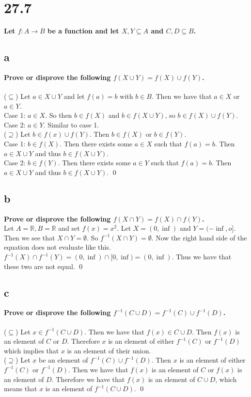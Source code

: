 \documentclass{article}
\begin{document}
\section*{27.7}
\textbf{Let $f: A \rightarrow B$ be a function and let $X, Y \subseteq A$ and $C, D \subseteq B$.}
\subsection*{a}
\textbf{Prove or disprove the following $f(X \cup Y) = f(X) \cup f(Y)$.}\\
\proof\\
($\subseteq$) Let $a \in X \cup Y$ and let $f(a) = b$ with $b \in B$. Then we have that $a \in X$ or $a \in Y$.\\
Case 1: $a \in X$. So then $b \in f(X)$ and $b \in f(X \cup Y)$, so $b \in f(X) \cup f(Y)$.\\
Case 2: $a \in Y$. Similar to case 1.\\
($\supseteq$) Let $b \in f(x) \cup f(Y)$. Then $b \in f(X)$ or $b \in f(Y)$.\\
Case 1: $b \in f(X)$. Then there exists some $a \in X$ such that $f(a) = b$. Then $a \in X \cup Y$ and thus $b \in f(X \cup Y)$.\\
Case 2: $b \in f(Y)$. Then there exists some $a \in Y$ such that $f(a) = b$. Then $a \in X \cup Y$ and thus $b \in f(X \cup Y)$. \qed

\subsection*{b}
\textbf{Prove or disprove the following $f(X \cap Y) = f(X) \cap f(Y)$.}\\
\noindent \dproof Let $A = \mathbb{R}, B = \mathbb{R}$ and set $f(x) = x^2$. Let $X = (0, \inf)$ and $Y = (-\inf, o]$. Then we see that $X \cap Y = \emptyset$. So $f^{-1}(X \cap Y) = \emptyset$. Now the right hand side of the equation does not evaluate like this. $f^{-1}(X) \cap f^{-1}(Y) = (0, \inf) \cap [0, \inf) = (0, \inf)$. Thus we have that these two are not equal. \qed

\subsection*{c}
\textbf{Prove or disprove the following $f^{-1}(C \cup D) = f^{-1}(C) \cup f^{-1}(D)$.}\\
\noindent \proof\\
($\subseteq$) Let $x \in f^{-1}(C \cup D)$. Then we have that $f(x) \in C \cup D$. Then $f(x)$ is an element of $C$ or $D$. Therefore $x$ is an element of either $f^{-1}(C)$ or $f^{-1}(D)$ which implies that $x$ is an element of their union.\\
($\supseteq$) Let $x$ be an element of $f^{-1}(C) \cup f^{-1}(D)$. Then $x$ is an element of either $f^{-1}(C)$ or $f^{-1}(D)$. Then we have that $f(x)$ is an element of $C$ or $f(x)$ is an element of $D$. Therefore we have that $f(x)$ is an element of $C \cup D$, which means that $x$ is an element of $f^{-1}(C \cup D)$. \qed
\end{document}
